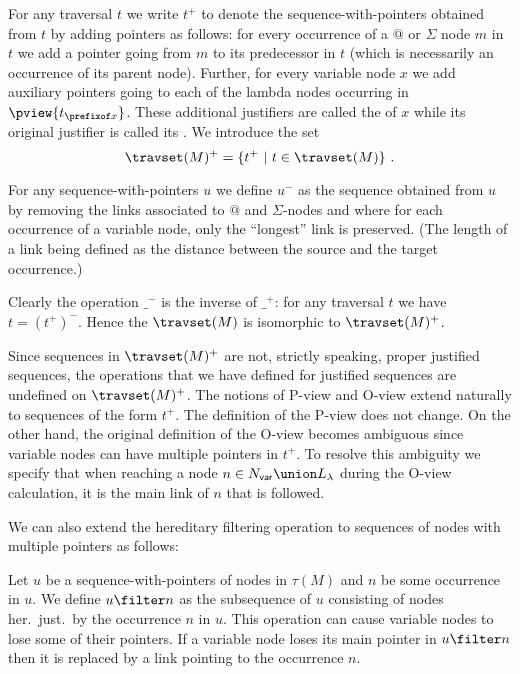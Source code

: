 For any traversal $t$ we write $t^+$ to denote the sequence-with-pointers obtained from $t$
by adding pointers as follows: for every occurrence of a $@$
or $\Sigma$ node $m$ in $t$ we add a pointer going from $m$ to its
predecessor in $t$ (which is necessarily an occurrence of its parent
node). Further, for every variable node $x$ we add auxiliary pointers going to each of the lambda nodes occurring in $\pview{t_{\prefixof x}}$. These additional justifiers are called the  of $x$ while its original justifier is called its .
We introduce the set
$$\travset(M)^+ = \{ t^+ \ | \  t \in \travset(M) \} \ .$$

For any sequence-with-pointers $u$ we define $u^-$ as the sequence obtained from $u$ by removing the links associated to $@$ and $\Sigma$-nodes
and where for each occurrence of a variable node, only the ``longest'' link is preserved. (The length of a link being defined as the distance between the source and the target occurrence.)

Clearly the operation $\_^-$ is the inverse of $\_^+$: for any traversal $t$ we have $t= (t^+)^-$. Hence the $\travset(M)$ is isomorphic
to $\travset(M)^+$.
\bigskip


Since sequences in $\travset(M)^+$ are not, strictly speaking,
proper justified sequences, the operations that we have defined for
justified sequences are undefined on $\travset(M)^+$. The notions of P-view and O-view extend naturally to sequences of the form $t^+$. The definition of the P-view does not change. On the other hand, the original definition of the O-view becomes ambiguous since variable nodes can have multiple pointers in $t^+$. To resolve this ambiguity we specify that when reaching a node $n \in N_{\sf var} \union L_\lambda$ during the O-view calculation, it is the main link of $n$ that is followed.

We can also extend the hereditary filtering operation to sequences of nodes with multiple pointers as follows:
\begin{definition}
Let $u$ be a sequence-with-pointers of nodes in $\tau(M)$ and $n$ be some occurrence in $u$. We define $u \filter n$ as the subsequence of $u$ consisting of nodes her.\ just.\ by the occurrence $n$ in $u$.
This operation can cause variable nodes to lose some of their pointers. If a variable node loses its main pointer in $u\filter n$
then it is replaced by a link pointing to the occurrence $n$.
\end{definition}

